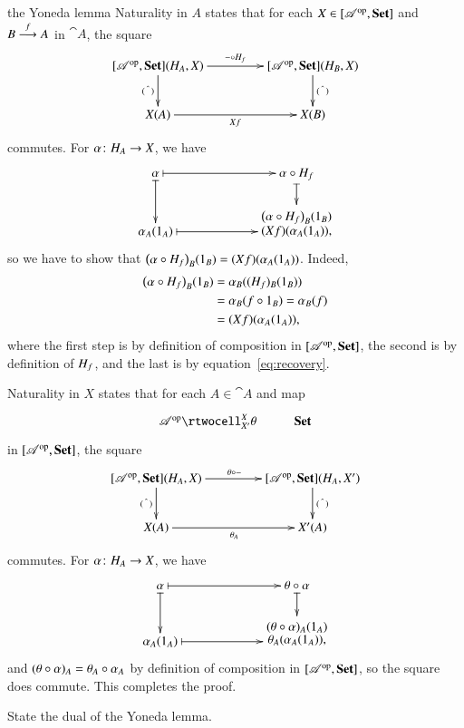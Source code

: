 \begin{pfof}{the Yoneda lemma}
Naturality in $A$ states that for each $X \in [\mathscr{A}^{\mathrm{op}},\mathbf{Set}]$ and
$B \stackrel{f}{\longrightarrow} A$ in $\cat{A}$, the square
\[
\xymatrix@C+2em{
\pshf{\cat{A}}(\h_A, X) \ar[r]^{\dashbk \of \h_f} \ar[d]_{\yel{\blank}} &
\pshf{\cat{A}}(\h_B, X) \ar[d]^{\yel{\blank}}   \\
X(A) \ar[r]_{Xf}        &
X(B)
}
\]
commutes.  For $\alpha\from \h_A \to X$, we have
\[
\xymatrix@C+4em{
\alpha \ar@{|->}[r] \ar@{|->}[d]    &
\alpha \of \h_f \ar@{|->}[d]    \\
\alpha_A(1_A) \ar@{|->}[r]    &
*!<0mm,-1.4ex>+\txt{$\bigl(\alpha \of \h_f\bigr)_B(1_B)$\\
$(Xf)(\alpha_A(1_A))$,}
}
\]
so we have to show that $\bigl(\alpha \mathbin{\circ} H_f\bigr)_B(1_B)=
(Xf)(\alpha_A(1_A))$.  Indeed,
% 
\begin{align*}
\bigl( \alpha \mathbin{\circ} H_f \bigr)_B(1_B)    &
=
\alpha_B ((H_f)_B (1_B)) \\
&
=
\alpha_B (f \mathbin{\circ} 1_B)    
=
\alpha_B(f) \\
&
=
(Xf)(\alpha_A(1_A)),
\end{align*}
% 
where the first step is by definition of composition in $[\mathscr{A}^{\mathrm{op}},\mathbf{Set}]$,
the second is by definition of $H_f$, and the last is by
equation~\eqref{eq:recovery}.

Naturality in $X$ states that for each $A \in \cat{A}$ and map
\[
\xymatrix{
\cat{A}^\op \rtwocell^{X}_{X'}{\theta} &\Set
}
\]
in $[\mathscr{A}^{\mathrm{op}},\mathbf{Set}]$, the square
\[
\xymatrix@C+2em{
\pshf{\cat{A}}(\h_A, X)  \ar[r]^{\theta \of \dashbk} \ar[d]_{\yel{\blank}} &
\pshf{\cat{A}}(\h_A, X') \ar[d]^{\yel{\blank}}  \\
X(A) \ar[r]_{\theta_A}  &
X'(A)
}
\]
commutes.  For $\alpha\from \h_A \to X$, we have
\[
\xymatrix@C+4em{
\alpha \ar@{|->}[r] \ar@{|->}[d]    &
\theta \of \alpha \ar@{|->}[d]    \\
\alpha_A(1_A) \ar@{|->}[r]    &
*!<0mm,-1.4ex>+\txt{$(\theta \of \alpha)_A(1_A)$\\
$\theta_A(\alpha_A(1_A))$,}
}
\]
and $(\theta\mathbin{\circ}\alpha)_A = \theta_A \mathbin{\circ} \alpha_A$ by definition of composition
in $[\mathscr{A}^{\mathrm{op}},\mathbf{Set}]$, so the square does commute.  This completes the proof.
\end{pfof}


\exs


\begin{question}
State the dual of the Yoneda lemma.
\end{question}


